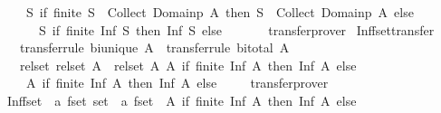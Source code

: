 \begin{isabellebody}
\ \ \ \ {\isacharparenleft}{\isasymlambda}S{\isachardot}\ if\ finite\ {\isacharparenleft}{\isasymInter}S\ {\isasyminter}\ Collect\ {\isacharparenleft}Domainp\ A{\isacharparenright}{\isacharparenright}\ then\ {\isasymInter}S\ {\isasyminter}\ Collect\ {\isacharparenleft}Domainp\ A{\isacharparenright}\ else\ {\isacharbraceleft}{\isacharbraceright}{\isacharparenright}\isanewline
\ \ \ \ \ \ {\isacharparenleft}{\isasymlambda}S{\isachardot}\ if\ finite\ {\isacharparenleft}Inf\ S{\isacharparenright}\ then\ Inf\ S\ else\ {\isacharbraceleft}{\isacharbraceright}{\isacharparenright}{\isachardoublequoteclose}\isanewline
%
\isadelimproof
\ \ \ \ %
\endisadelimproof
%
\isatagproof
{}\isamarkupfalse%
\ transfer{\isacharunderscore}prover%
\endisatagproof
{\isafoldproof}%
%
\isadelimproof
\isanewline
%
\endisadelimproof
\isanewline
{}\isamarkupfalse%
\ Inf{\isacharunderscore}fset{\isacharunderscore}transfer{\isacharcolon}\isanewline
\ \ \ {\isacharbrackleft}transfer{\isacharunderscore}rule{\isacharbrackright}{\isacharcolon}\ {\isachardoublequoteopen}bi{\isacharunderscore}unique\ A{\isachardoublequoteclose}\ \ {\isacharbrackleft}transfer{\isacharunderscore}rule{\isacharbrackright}{\isacharcolon}\ {\isachardoublequoteopen}bi{\isacharunderscore}total\ A{\isachardoublequoteclose}\isanewline
\ \ \ {\isachardoublequoteopen}{\isacharparenleft}rel{\isacharunderscore}set\ {\isacharparenleft}rel{\isacharunderscore}set\ A{\isacharparenright}\ {\isacharequal}{\isacharequal}{\isacharequal}{\isachargreater}\ rel{\isacharunderscore}set\ A{\isacharparenright}\ {\isacharparenleft}{\isasymlambda}A{\isachardot}\ if\ finite\ {\isacharparenleft}Inf\ A{\isacharparenright}\ then\ Inf\ A\ else\ {\isacharbraceleft}{\isacharbraceright}{\isacharparenright}\isanewline
\ \ \ \ {\isacharparenleft}{\isasymlambda}A{\isachardot}\ if\ finite\ {\isacharparenleft}Inf\ A{\isacharparenright}\ then\ Inf\ A\ else\ {\isacharbraceleft}{\isacharbraceright}{\isacharparenright}{\isachardoublequoteclose}\isanewline
%
\isadelimproof
\ \ %
\endisadelimproof
%
\isatagproof
{}\isamarkupfalse%
\ transfer{\isacharunderscore}prover%
\endisatagproof
{\isafoldproof}%
%
\isadelimproof
\isanewline
%
\endisadelimproof
\isanewline
{}\isamarkupfalse%
\ Inf{\isacharunderscore}fset\ {\isacharcolon}{\isacharcolon}\ {\isachardoublequoteopen}{\isacharprime}a\ fset\ set\ {\isasymRightarrow}\ {\isacharprime}a\ fset{\isachardoublequoteclose}\ \ {\isachardoublequoteopen}{\isasymlambda}A{\isachardot}\ if\ finite\ {\isacharparenleft}Inf\ A{\isacharparenright}\ then\ Inf\ A\ else\ {\isacharbraceleft}{\isacharbraceright}{\isachardoublequoteclose}\isanewline

\end{isabellebody}
